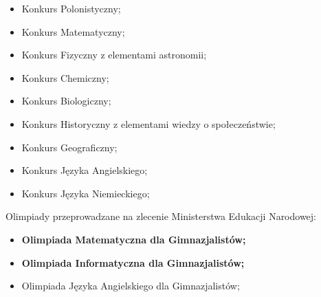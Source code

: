 \documentclass[a4paper,12pt]{scrartcl}
\begin{document}
\begin{itemize}
\item Konkurs Polonistyczny;
\item Konkurs Matematyczny;
\item Konkurs Fizyczny z elementami astronomii;
\item Konkurs Chemiczny;
\item Konkurs Biologiczny;
\item Konkurs Historyczny z elementami wiedzy o społeczeństwie;
\item Konkurs Geograficzny;
\item Konkurs Języka Angielskiego;
\item Konkurs Języka Niemieckiego;
\end{itemize}
Olimpiady przeprowadzane na zlecenie Ministerstwa Edukacji Narodowej:
\begin{itemize}
\item {\bf Olimpiada Matematyczna dla Gimnazjalistów;}
\item {\bf Olimpiada Informatyczna dla Gimnazjalistów;}
\item Olimpiada Języka Angielskiego dla Gimnazjalistów;
\end{itemize}
\end{document}

